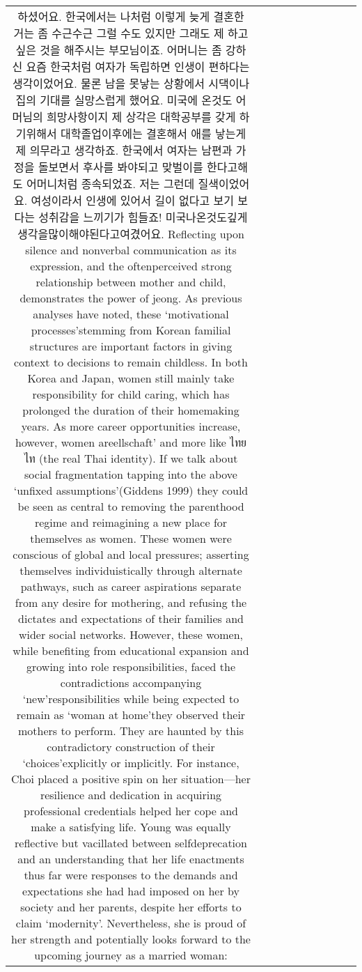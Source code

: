 \begin{table}[h!]
\begin{tabular}{|c|c|c|c|c|c|c|c|c|c|}
{하셨어요. 한국에서는 나처럼 이렇게 늦게 결혼한 거는 좀 수근수근 그럴 수도
있지만 그래도 제 하고 싶은 것을 해주시는 부모님이죠. 어머니는 좀 강하신
요즘 한국처럼 여자가 독립하면 인생이 편하다는 생각이었어요. 물론 남을 못낳는 상황에서 시댁이나 집의 기대를 실망스럽게 했어요. 미국에 온것도 어머님의 희망사항이지 제 상각은 대학공부를 갖게 하기위해서 대학졸업이후에는 결혼해서 애를 낳는게 제 의무라고 생각하죠. 한국에서 여자는 남편과 가정을 돌보면서 후사를 봐야되고 맞벌이를 한다고해도 어머니처럼 종속되었죠. 저는 그런데 질색이었어요.
여성이라서 인생에 있어서 길이 없다고 보기 보다는 성취감을 느끼기가 힘들죠! 미국나온것도깊게생각을많이해야된다고여겼어요.
Reflecting upon silence and nonverbal communication as its expression, and the oftenperceived strong relationship between mother and child, demonstrates the power of
jeong. As previous analyses have noted, these ‘motivational processes’stemming from Korean familial structures are important factors in giving context to decisions to remain childless. In both Korea and Japan, women still mainly take responsibility for child caring, which has prolonged the duration of their homemaking years. As more career opportunities increase, however, women areellschaft’ and more like ไทยไท (the real Thai identity). If we talk about social fragmentation tapping into the above ‘unfixed assumptions’(Giddens 1999) they could be seen as central to removing the parenthood regime and reimagining a new place for themselves as women. These women were conscious of global and local pressures; asserting themselves individuistically through alternate pathways, such as career aspirations separate from any desire for
mothering, and refusing the dictates and expectations of their families and wider social networks. However, these women, while benefiting from educational expansion and growing into role responsibilities, faced the contradictions accompanying ‘new’responsibilities while being expected to remain as ‘woman at home’they observed their mothers to perform.
They are haunted by this contradictory construction of their ‘choices’explicitly or implicitly. For instance, Choi placed a positive spin on her situation—her resilience and dedication in acquiring professional credentials helped her cope and make a satisfying life. Young was equally reflective but vacillated between selfdeprecation and an understanding that her life enactments thus far were responses to the demands and expectations she had had imposed on her by society and her parents, despite her efforts to claim ‘modernity’. Nevertheless, she is proud of her strength and potentially looks forward to the upcoming journey as a married woman:
}
\end{tabular}
\end{table}
